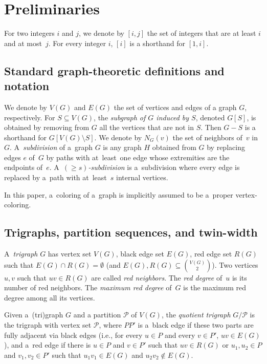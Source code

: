 \documentclass[a4paper,USenglish,cleveref,hyperref,autoref]{lipics-v2021}
\begin{document}
\section{Preliminaries}\label{sec:prelim}

For two integers $i$ and $j$, we denote by $[i,j]$ the set of integers that are at least $i$ and at most~$j$.
For every integer $i$, $[i]$ is a shorthand for $[1,i]$.

\subsection{Standard graph-theoretic definitions and notation}

We denote by $V(G)$ and $E(G)$ the set of vertices and edges of a graph $G$, respectively.
For $S \subseteq V(G)$, the \emph{subgraph of $G$ induced by $S$}, denoted $G[S]$, is obtained by removing from $G$ all the vertices that are not in $S$.
Then $G-S$ is a shorthand for $G[V(G)\setminus S]$.
We denote by $N_G(v)$ the set of neighbors of~$v$ in~$G$.
A~\emph{subdivision} of a~graph $G$ is any graph $H$ obtained from $G$ by replacing edges $e$ of~$G$ by paths with at~least~one edge whose extremities are the endpoints of~$e$.
A~\emph{$(\geqslant s)$-subdivision} is a~subdivision where every edge is replaced by a~path with at~least~$s$ internal vertices. 

In this paper, a~coloring of a~graph is implicitly assumed to be a~proper vertex-coloring.

\subsection{Trigraphs, partition sequences, and twin-width}

A~\emph{trigraph} $G$ has vertex set $V(G)$, black edge set $E(G)$, red edge set $R(G)$ such that $E(G) \cap R(G) = \emptyset$ (and $E(G),R(G) \subseteq {V(G) \choose 2}$).
Two vertices $u, v$ such that $uv \in R(G)$ are called \emph{red neighbors}.
The \emph{red degree} of~$u$ is its number of red neighbors.
The \emph{maximum red degree} of~$G$ is the maximum red degree among all its vertices.

Given a~(tri)graph $G$ and a partition $\mathcal P$ of $V(G)$, the \emph{quotient trigraph} $G/\mathcal P$ is the trigraph with vertex set $\mathcal P$, where $PP'$ is a~black edge if these two parts are fully adjacent via black edges (i.e., for every $u \in P$ and every $v \in P'$, $uv \in E(G)$), and a~red edge if there is $u \in P$ and $v \in P'$ such that $uv \in R(G)$ or $u_1, u_2 \in P$ and $v_1, v_2 \in P'$ such that $u_1v_1 \in E(G)$ and $u_2v_2 \notin E(G)$.
\end{document}
